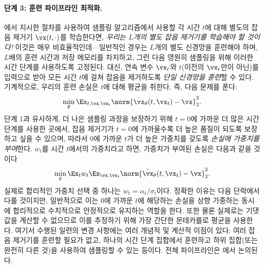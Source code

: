 \documentclass[../../book-main_ko.tex]{subfiles}
\begin{document}
\paragraph{단계 3: 훈련 파이프라인 최적화.} 에서 지시한 절차를 사용하여 샘플링 알고리즘에서 사용할 각 시간 \(t\)에 대해 별도의 잡음 제거기 \(\bar{\vx}(t, \cdot)\)를 학습한다면, \textit{우리는 \(L\)개의 별도 잡음 제거기를 학습해야 할 것이다!} 이것은 매우 비효율적인데—일반적인 경우는 \(L\)개의 별도 신경망을 훈련해야 하며, \(L\)배의 훈련 시간과 저장 메모리를 차지하고, 그런 다음 영원히 샘플링을 위해 이러한 시간 단계를 사용하도록 고정된다. 대신, 연속 변수 \(\vx_{t}\)와 \(t\)(이전의 \(\vx_{t}\)만이 아닌)를 입력으로 받아 모든 시간 \(t\)에 걸쳐 잡음을 제거하도록 \textit{단일 신경망을 훈련}할 수 있다. 기계적으로, 우리의 훈련 손실은 \(t\)에 대해 평균을 취한다. 즉, 다음 문제를 푼다:
\begin{equation}
	\min_{\theta}\Ex_{t, \vx, \vx_{t}}\norm{\bar{\vx}_{\theta}(t, \vx_{t}) - \vx}_{2}^{2}.
\end{equation}
단계 1과 유사하게, 더 나은 샘플링 과정을 보장하기 위해 \(t = 0\)에 가까운 더 많은 시간 단계를 사용한 곳에서, 잡음 제거기가 \(t = 0\)에 가까울수록 더 높은 품질이 되도록 보장하고 싶을 수 있으며, 따라서 \(0\)에 가까운 \(t\)가 더 높은 가중치를 갖도록 \textit{손실에 가중치를 부여}한다. \(w_{t}\)를 시간 \(t\)에서의 가중치라고 하면, 가중치가 부여된 손실은 다음과 같을 것이다
\begin{equation}\label{eq:parametric_denoising_loss}
	\min_{\theta}\Ex_{t}w_{t}\Ex_{\vx, \vx_{t}}\norm{\bar{\vx}_{\theta}(t, \vx_{t}) - \vx}_{2}^{2}.
\end{equation}
실제로 합리적인 가중치 선택 중 하나는 \(w_{t} = \alpha_{t}/\sigma_{t}\)이다. 정확한 이유는 다음 단락에서 다룰 것이지만, 일반적으로 이는 \(0\)에 가까운 \(t\)에 해당하는 손실을 상향 가중하는 동시에 합리적으로 수치적으로 안정적으로 유지하는 역할을 한다. 또한 물론 실제로는 기댓값을 계산할 수 없으므로 이를 추정하기 위해 가장 간단한 몬테카를로 평균을 사용한다. 여기서 수행된 일련의 변경 사항에는 여러 개념적 및 계산적 이점이 있다: 여러 잡음 제거기를 훈련할 필요가 없고, 하나의 시간 단계 집합에서 훈련하고 하위 집합(또는 완전히 다른 것)을 사용하여 샘플링할 수 있는 등이다. 전체 파이프라인은 에서 논의된다.
\end{document}
